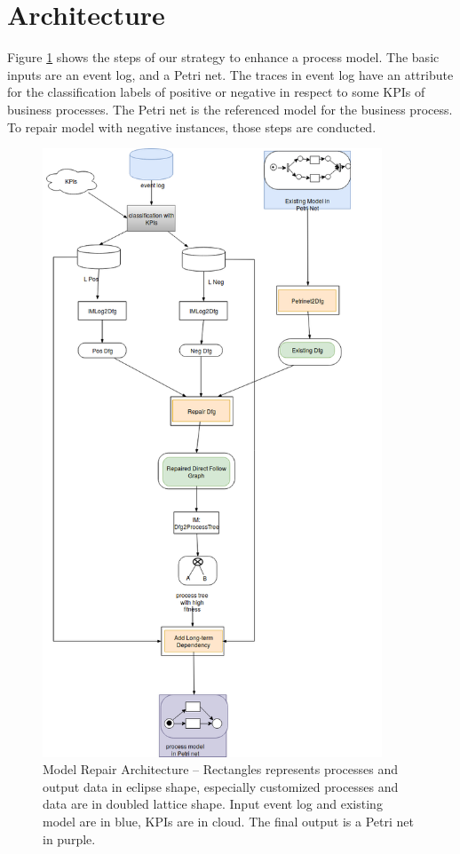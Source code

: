 \section{Architecture}
Figure \ref{fig:architecture} shows the steps of our strategy to enhance a process model. The basic inputs are an event log, and a Petri net. The traces in event log have an attribute for the classification labels of positive or negative in respect to some KPIs of business processes. The Petri net is the referenced model for the business process. To repair model with negative instances,  those steps are conducted.
\begin{figure}
	\includegraphics[width=0.9\textwidth, height=0.9\textheight]{figures/algorithm/FD_architecture_detail_02.png}
	\caption[Model Repair Architecture]{Model Repair Architecture -- \small Rectangles represents processes and output data in eclipse shape, especially customized processes and data are in doubled lattice shape. Input event log and existing model are in blue, KPIs are in cloud. The final output is a Petri net in purple. }
	\label{fig:architecture}
\end{figure} 

